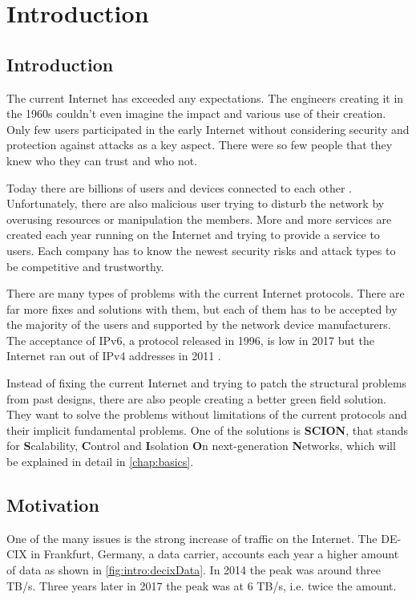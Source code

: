 \documentclass[thesis.tex]{subfiles}
\begin{document}
\chapter{Introduction}
\label{chap:introduction}


\section{Introduction}
The current Internet has exceeded any expectations. The engineers creating it in the 1960s couldn't even imagine the impact and various use of their creation. Only few users participated in the early Internet without considering security and protection against attacks as a key aspect. There were so few people that they knew who they can trust and who not.

Today there are billions of users and devices connected to each other \cite{MiniwattsMarketingGroup.31.12.2017}. Unfortunately, there are also malicious user trying to disturb the network by overusing resources or manipulation the members. More and more services are created each year running on the Internet and trying to provide a service to users. Each company has to know the newest security risks and attack types to be competitive and trustworthy. 

There are many types of problems with the current Internet protocols. There are far more fixes and solutions with them, but each of them has to be accepted by the majority of the users and supported by the network device manufacturers. The acceptance of IPv6, a protocol released in 1996, is low in 2017 but the Internet ran out of IPv4 addresses in 2011 \cite{ICANN.03.02.2011}.

Instead of fixing the current Internet and trying to patch the structural problems from past designs, there are also people creating a better green field solution. They want to solve the problems without limitations of the current protocols and their implicit fundamental problems. One of the solutions is \textbf{SCION}, that stands for \textbf{S}calability, \textbf{C}ontrol and \textbf{I}solation \textbf{O}n next-generation \textbf{N}etworks, which will be explained in detail in \autoref{chap:basics}.


\section{Motivation}
One of the many issues is the strong increase of traffic on the Internet. The DE-CIX in Frankfurt, Germany, a data carrier, accounts each year a higher amount of data as shown in \autoref{fig:intro:decixData}. In 2014 the peak was around three TB/s. Three years later in 2017 the peak was at 6 TB/s, i.e. twice the amount. 
\end{document}
